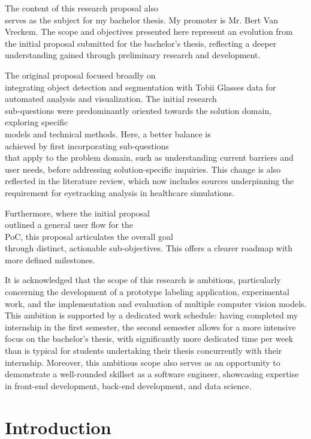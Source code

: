 \documentclass[english]{hogent-article}
\begin{document}
The content of this research proposal also\\ serves as the subject for my bachelor thesis. 
My promoter is Mr. Bert Van Vreckem. The scope and objectives presented here represent an evolution from the initial proposal submitted 
for the bachelor's thesis, reflecting a deeper understanding gained through preliminary research and development.

The original proposal focused broadly on\\ integrating object detection and segmentation with Tobii Glasses data for automated analysis and visualization.
The initial research\\ sub-questions were predominantly oriented towards the solution domain, exploring specific\\ models and technical methods.
Here, a better balance is\\ achieved by first incorporating sub-questions\\ that apply to the problem domain, 
such as understanding current barriers and user needs, before addressing solution-specific inquiries.
This change is also reflected in the literature review, which now includes sources underpinning the requirement for eyetracking analysis in healthcare simulations.

Furthermore, where the initial proposal\\ outlined a general user flow for the\\ PoC,
this proposal articulates the overall goal\\ through distinct, actionable sub-objectives.
This offers a clearer roadmap with more defined milestones.

It is acknowledged that the scope of this research is ambitious, particularly concerning the development of a 
prototype labeling application, experimental work, and the implementation and evaluation of multiple computer vision models.
This ambition is supported by a dedicated work schedule: having completed my internship in the first semester, the second semester allows for a more intensive focus
on the bachelor's thesis, with significantly more dedicated time per week than is typical for students undertaking their thesis concurrently with their internship.
Moreover, this ambitious scope also serves as an opportunity to demonstrate a well-rounded skillset as a software engineer, showcasing expertise in front-end development, back-end development, and data science.

\section{Introduction}
\label{sec:Introduction}
\end{document}
